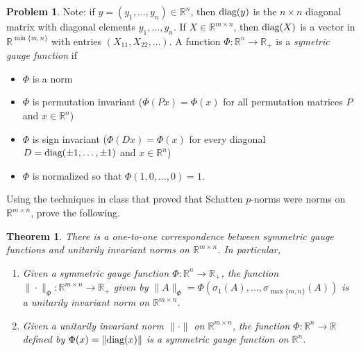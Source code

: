 \documentclass{amsart}[11pt]
\newtheorem{theorem}{Theorem}[section]
\theoremstyle{definition}
\newtheorem{problem}{Problem}
\newcommand{\R}{\mathbb{R}}
\newcommand{\diag}{\textnormal{diag}}
\begin{document}
\begin{problem}
Note: if $y = (y_1, \dots, y_n)\in\R^n$, then $\diag(y)$ is the $n\times n$ diagonal matrix with diagonal elements $y_1,\dots,y_n$. If $X\in\R^{m\times n}$, then $\diag(X)$ is a vector in $\R^{\min\{m,n\}}$ with entries $(X_{11},X_{22},\dots)$. A function $\Phi:\R^n\to\R_+$ is a \textit{symetric gauge function} if
\begin{itemize}
\item $\Phi$ is a norm
\item $\Phi$ is permutation invariant ($\Phi(Px)=\Phi(x)$ for all permutation matrices $P$ and $x\in\R^n$)
\item $\Phi$ is sign invariant ($\Phi(Dx) = \Phi(x)$ for every diagonal $D=\diag(\pm1,\dots,\pm1)$ and $x\in\R^n$)
\item $\Phi$ is normalized so that $\Phi(1,0,\dots,0) = 1$.
\end{itemize}
Using the techniques in class that proved that Schatten $p$-norms were norms on $\R^{m\times n}$, prove the following.
\begin{theorem}
There is a one-to-one correspondence between symmetric gauge functions and unitarily invariant norms on $\R^{m\times n}$. In particular,
\begin{enumerate}[(1)]
\item Given a symmetric gauge function $\Phi:\R^n\to\R_+$, the function $\|\cdot\|_\Phi:\R^{m\times n}\to\R_+$ given by $\|A\|_\Phi = \Phi(\sigma_1(A),\dots,\sigma_{\max\{m,n\}}(A))$ is a unitarily invariant norm on $\R^{m\times n}$.
\item Given a unitarily invariant norm $\|\cdot\|$ on $\R^{m\times n}$, the function $\Phi:\R^n\to\R$ defined by $\Phi(x) = \|\diag(x)\|$ is a symmetric gauge function on $\R^n$.
\end{enumerate}
\end{theorem}
\end{problem}
\end{document}
